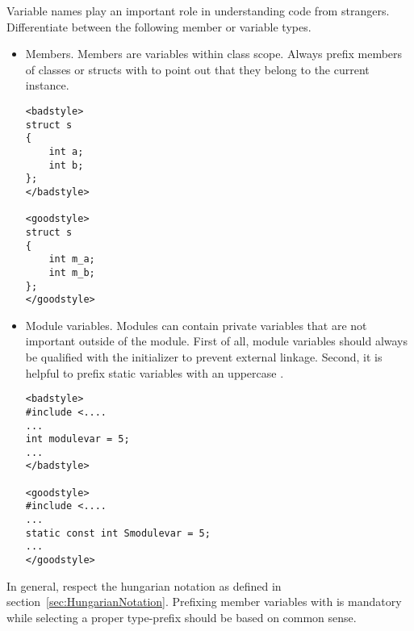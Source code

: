 Variable names play an important role in understanding code from strangers.
Differentiate between the following member or variable types.
\begin{itemize}
\item Members. 
Members are variables within class scope. 
Always prefix members of classes or structs with  to point out that they belong to the current instance.
\begin{verbatim}
<badstyle>
struct s 
{
	int a;
	int b;
};
</badstyle>

<goodstyle>
struct s
{
	int m_a;
	int m_b;
};
</goodstyle>
\end{verbatim}
\item Module variables.
Modules can contain private variables that are not important outside of the module.
First of all, module variables should always be qualified with the  initializer to prevent external linkage.
Second, it is helpful to prefix static variables with an uppercase .
\begin{verbatim}
<badstyle>
#include <....
...
int modulevar = 5;
...
</badstyle>

<goodstyle>
#include <....
...
static const int Smodulevar = 5;
...
</goodstyle>
\end{verbatim}
\end{itemize}
In general, respect the hungarian notation as defined in section~\ref{sec:HungarianNotation}.
Prefixing member variables with  is mandatory while selecting a proper type-prefix should be based on common sense.

